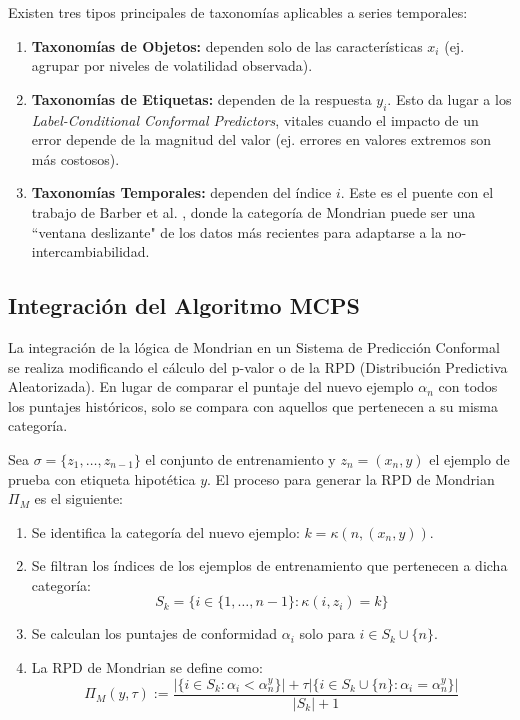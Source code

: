 Existen tres tipos principales de taxonomías aplicables a series temporales:
\begin{enumerate}
    \item \textbf{Taxonomías de Objetos:} dependen solo de las características $x_i$ (ej. agrupar por niveles de volatilidad observada).
    \item \textbf{Taxonomías de Etiquetas:} dependen de la respuesta $y_i$. Esto da lugar a los \textit{Label-Conditional Conformal Predictors}, vitales cuando el impacto de un error depende de la magnitud del valor (ej. errores en valores extremos son más costosos).
    \item \textbf{Taxonomías Temporales:} dependen del índice $i$. Este es el puente con el trabajo de Barber et al. \cite{Barber2023}, donde la categoría de Mondrian puede ser una ``ventana deslizante" de los datos más recientes para adaptarse a la no-intercambiabilidad.
\end{enumerate}

\subsection{Integración del Algoritmo MCPS}

La integración de la lógica de Mondrian en un Sistema de Predicción Conformal se realiza modificando el cálculo del p-valor o de la RPD (Distribución Predictiva Aleatorizada). En lugar de comparar el puntaje del nuevo ejemplo $\alpha_n$ con todos los puntajes históricos, solo se compara con aquellos que pertenecen a su misma categoría.

Sea $\sigma = \{z_1, \dots, z_{n-1}\}$ el conjunto de entrenamiento y $z_n = (x_n, y)$ el ejemplo de prueba con etiqueta hipotética $y$. El proceso para generar la RPD de Mondrian $\Pi_{M}$ es el siguiente:

\begin{enumerate}
    \item Se identifica la categoría del nuevo ejemplo: $k = \kappa(n, (x_n, y))$.
    \item Se filtran los índices de los ejemplos de entrenamiento que pertenecen a dicha categoría:
    \begin{equation}
        S_k = \{i \in \{1, \dots, n-1\} : \kappa(i, z_i) = k\}
    \end{equation}
    \item Se calculan los puntajes de conformidad $\alpha_i$ solo para $i \in S_k \cup \{n\}$.
    \item La RPD de Mondrian se define como:
    \begin{equation}
    \Pi_{M}(y, \tau) := \frac{|\{i \in S_k : \alpha_i < \alpha_n^y\}| + \tau |\{i \in S_k \cup \{n\} : \alpha_i = \alpha_n^y\}|}{|S_k| + 1}
    \label{eq:mondrian_rpd}
    \end{equation}
\end{enumerate}

